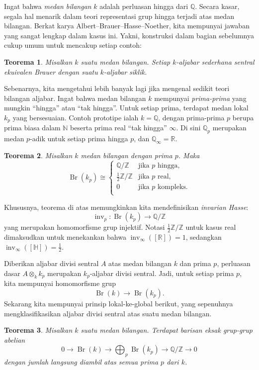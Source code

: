 \documentclass[12pt]{article}
\theoremstyle{plain}
\newtheorem{theorem}{Teorema}[section]
\theoremstyle{definition}
\theoremstyle{remark}
\numberwithin{equation}{section}
\begin{document}
Ingat bahwa \emph{medan bilangan} $k$ adalah perluasan hingga dari
$\mathbb{Q}$. Secara kasar, segala hal menarik dalam
teori representasi grup hingga terjadi atas medan bilangan.
Berkat karya Albert--Brauer--Hasse--Noether, kita mempunyai jawaban yang sangat lengkap
dalam kasus ini. Yakni, konstruksi dalam bagian sebelumnya
cukup umum untuk mencakup setiap contoh:

\begin{theorem}
Misalkan $k$ suatu medan bilangan.
Setiap $k$-aljabar sederhana sentral ekuivalen Brauer dengan suatu
$k$-aljabar siklik.
\end{theorem}

Sebenarnya, kita mengetahui lebih banyak lagi jika mengenal sedikit teori bilangan aljabar.
Ingat bahwa medan bilangan $k$ mempunyai \emph{prima-prima}
yang mungkin “hingga” atau “tak hingga”.
Untuk setiap prima, terdapat medan lokal $k_p$ yang bersesuaian.
Contoh prototipe ialah $k=\mathbb{Q}$, dengan prima-prima $p$ berupa
prima biasa dalam $\mathbb{N}$ beserta prima real “tak hingga”
$\infty$. Di sini $\mathbb{Q}_p$ merupakan medan $p$-adik untuk setiap
prima hingga $p$, dan $\mathbb{Q}_\infty = \mathbb{R}$.

\begin{theorem}
Misalkan $k$ medan bilangan dengan prima $p$. Maka
\[
\operatorname{Br}(k_p) \cong
\begin{cases}
\mathbb{Q}/\mathbb{Z} & \textrm{jika $p$ hingga,}\\
\frac{1}{2}\mathbb{Z}/\mathbb{Z} & \textrm{jika $p$ real,}\\
0 & \textrm{jika $p$ kompleks.}\\
\end{cases}
\]
\end{theorem}

Khususnya, teorema di atas memungkinkan kita mendefinisikan
\emph{invarian Hasse}:
\[
\operatorname{inv}_p : \operatorname{Br}(k_p) \to \mathbb{Q}/\mathbb{Z}
\]
yang merupakan homomorfisme grup injektif.
Notasi $\frac{1}{2}\mathbb{Z}/\mathbb{Z}$ untuk kasus real
dimaksudkan untuk menekankan bahwa $\operatorname{inv}_\infty([\mathbb{R}])=1$,
sedangkan $\operatorname{inv}_\infty([\mathbb{H}])=\frac{1}{2}$.

Diberikan aljabar divisi sentral $A$ atas medan bilangan $k$
dan prima $p$, perluasan dasar $A \otimes_k k_p$ merupakan
$k_p$-aljabar divisi sentral.
Jadi, untuk setiap prima $p$, kita mempunyai homomorfisme grup
\[
\operatorname{Br}(k) \to \operatorname{Br}(k_p).
\]
Sekarang kita mempunyai prinsip lokal-ke-global berikut,
yang sepenuhnya mengklasifikasikan aljabar divisi sentral atas suatu medan
bilangan.

\begin{theorem}
Misalkan $k$ suatu medan bilangan.
Terdapat barisan eksak grup-grup abelian
\[
0 \to \operatorname{Br}(k) \to
\bigoplus_p \operatorname{Br}(k_p) \to \mathbb{Q}/\mathbb{Z} \to 0
\]
dengan jumlah langsung diambil atas semua prima $p$ dari $k$.
\end{theorem}



\end{document}
